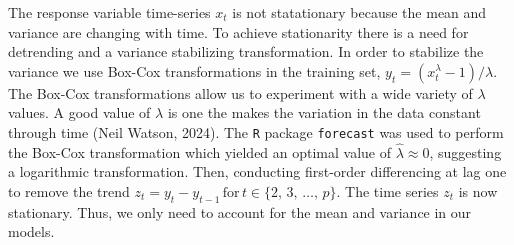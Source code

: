 \documentclass[a4paper, 10pt, fleqn]{article}
\begin{document}
\begin{flushleft}
      The response variable time-series $x_{t}$ is not statationary because the mean and variance are changing with time. To achieve stationarity there is a need for detrending and a variance stabilizing transformation. In order to stabilize the variance we use Box-Cox transformations in the training set, $y_{t} = (x_{t}^{\lambda} - 1) / \lambda$. The Box-Cox transformations allow us to experiment with a wide variety of $\lambda$ values. A good value of $\lambda$ is one the makes the variation in the data constant through time (Neil Watson, 2024). The \texttt{R} package \texttt{forecast} was used to perform the Box-Cox transformation which yielded an optimal value of $\hat{\lambda} \approx 0$, suggesting a logarithmic transformation. Then, conducting first-order differencing at lag one to remove the trend $z_{t} = y_{t} - y_{t-1} \, \text{for} \, t \in \{2, \, 3, \, \ldots, \, p\}$. The time series $z_{t}$ is now stationary. Thus, we only need to account for the mean and variance in our models.      


\end{flushleft}
\end{document}
